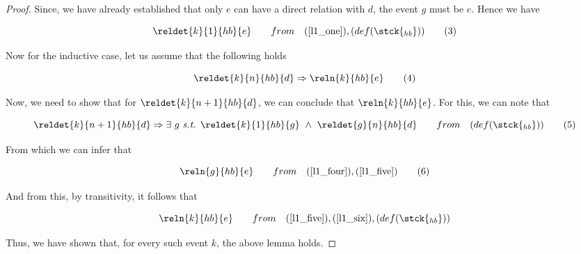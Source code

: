 \begin{proof}
        Since, we have already established that only $e$ can have a direct relation with $d$, the event $g$ must be $e$. Hence we have
        
        \[
            \reldet{k}{1}{hb}{e} \qquad
            from \quad 
            (\ref{l1_one}),
            (def(\stck{_{hb}}))
            \tag{3}
            \label{l1_three}
        \]
        
        Now for the inductive case, let us assume that the following holds
        
        \[
            \reldet{k}{n}{hb}{d} \Rightarrow
            \reln{k}{hb}{e}
            \tag{4}
            \label{l1_four}
        \]
        
        Now, we need to show that for $\reldet{k}{n+1}{hb}{d}$, we can conclude that $\reln{k}{hb}{e}$. For this, we can note that
        
        \[
            \reldet{k}{n+1}{hb}{d} \Rightarrow
            \exists \ g \ \textit{s.t. } 
            \reldet{k}{1}{hb}{g} \ \wedge \ 
            \reldet{g}{n}{hb}{d} \qquad
            from \quad
            (def(\stck{_{hb}}))
            \tag{5}
            \label{l1_five}
        \]
        
        From which we can infer that
        
        \[
            \reln{g}{hb}{e} \qquad
            from \quad
            (\ref{l1_four}),
            (\ref{l1_five})
            \tag{6}
            \label{l1_six}
        \]
        
        And from this, by transitivity, it follows that
        
        \[
            \reln{k}{hb}{e} \qquad
            from \quad
            (\ref{l1_five}),
            (\ref{l1_six}),
            (def(\stck{_{hb}}))
        \]
        
        Thus, we have shown that, for every such event $k$, the above lemma holds. 
    \end{proof}
 
   


 
 
